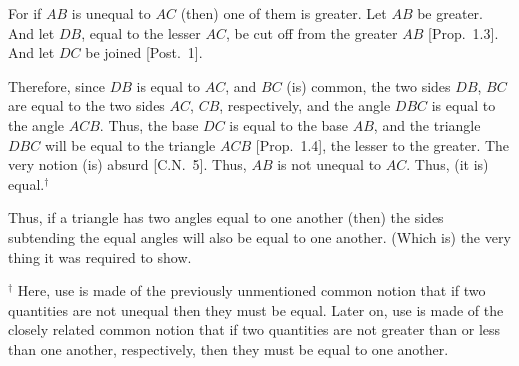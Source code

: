 \begin{Parallel}{}{}
{For if $AB$ is unequal to $AC$ (then) one of them is greater. Let $AB$ be greater. And
let $DB$, equal to the lesser $AC$, be cut off from the greater $AB$ [Prop.~1.3].  And
let $DC$ be joined [Post.~1].

Therefore, since $DB$ is equal to $AC$, and $BC$ (is) common, the two sides $DB$, $BC$ are equal to the two sides $AC$, $CB$, respectively, and the angle $DBC$
is equal to the angle $ACB$. Thus, the base $DC$ is equal to the base
$AB$, and the triangle $DBC$ will be equal to the triangle $ACB$ [Prop.~1.4], the lesser
to the greater. The very notion (is) absurd [C.N.~5]. Thus, $AB$ is not unequal
to $AC$. Thus, (it is) equal.$^\dag$

Thus, if a triangle has two angles equal to one another (then) the sides subtending the
equal angles will also be equal to one another. (Which is) the very thing it was required to show.}
\end{Parallel}
{\footnotesize \noindent $^\dag$ Here, use is made of the previously
unmentioned common notion that if two quantities are not unequal then they must be equal. Later on, use is made of the closely related common notion
that if two quantities are not greater than or less than one another, respectively, then they must be equal to one another.}

